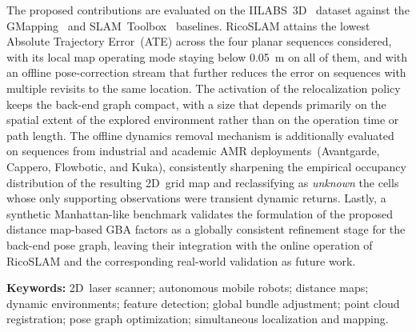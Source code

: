 The proposed contributions are evaluated on the
IILABS~3D~\cite{ribeiro:access:2025} dataset against the
GMapping~\cite{grisetti:tro:2007} and
SLAM~Toolbox~\cite{macenski-jambrecic:joss:2021} baselines. RicoSLAM
attains the lowest Absolute Trajectory Error~(ATE) across the four
planar sequences considered, with its local map operating mode staying below
\SI{0.05}{\metre} on all of them, and with an offline pose-correction stream
that further reduces the error on sequences with multiple revisits to the same
location. The
activation of the relocalization policy keeps the back-end graph
compact, with a size that depends primarily on the spatial extent of
the explored environment rather than on the operation time or path length.
The offline dynamics removal mechanism is additionally evaluated on sequences
from industrial and academic AMR deployments~(Avantgarde, Cappero, Flowbotic,
and Kuka), consistently sharpening the empirical occupancy
distribution of the resulting 2D~grid map and reclassifying as
\emph{unknown} the cells whose only supporting observations were transient
dynamic returns. Lastly, a synthetic Manhattan-like benchmark validates the
formulation of the proposed distance map-based GBA factors as a globally
consistent refinement stage for the back-end pose graph, leaving their
integration with the online operation of RicoSLAM and the corresponding
real-world validation as future work.

\hfill

\textbf{Keywords:}
2D~laser scanner;
autonomous mobile robots;
distance maps;
dynamic environments;
feature detection;
global bundle adjustment;
point cloud registration;
pose graph optimization;
simultaneous localization and mapping.

\cleardoublepage
